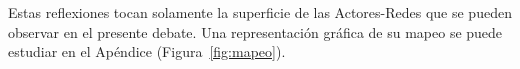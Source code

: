 Estas reflexiones tocan solamente la superficie de las Actores-Redes que se pueden observar en el presente debate.
Una representación gráfica de su mapeo se puede estudiar en el Apéndice (Figura~\vref{fig:mapeo}).

\begin{comment}

[FiTre2015]
eigentlich sehen sie sich nicht zwangslaeufig als politisch y operan más fuera de la lógica de la política convencional de instituciones o del activismo político disidente (protestas, etc.)
"One way is to address the issue from within the political system, as ‘insiders’, formally interacting with the power holders"
"Another solution is to fight the problem as ‘outsiders’, pressuring both regulators and
incumbents from outside the political system, by means of protests, demonstrations and other campaigning tactics"
"Yet, most of the community networks we surveyed do not properly qualify as what social movement scholars define as ‘insiders’ (although they
sometimes do interact with policy-makers), and much less as ‘outsiders’. Mostly, they fall within the third category—what Milan identifies as
‘beyonders’."
"remaining beyond the political system"
--> vgl auch "route around laws" from Rieders text (zitat eff mensch)

allerdings sind sie schon in essenz politisch:
"hese networks are ‘prefigurative realities’ that
challenge the status quo and ultimately contribute to a new political order (Milan, 2013, pp.126-38): these networks – built ‘for the people, by the
people’ – fundamentally embody a form of political action."

\end{comment}

